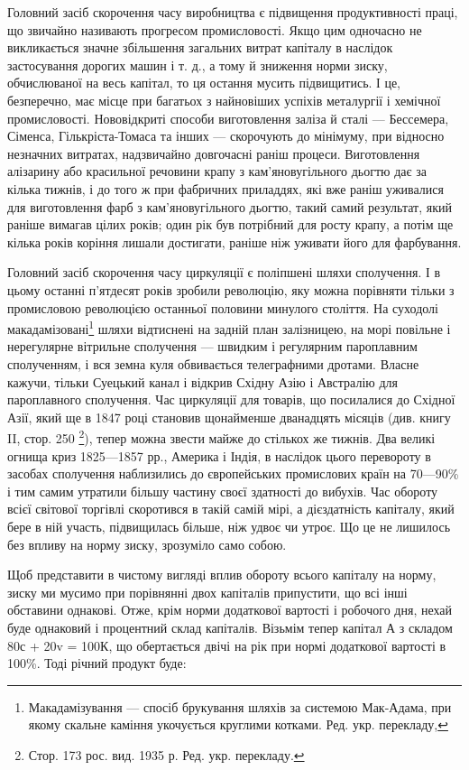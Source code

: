 Головний засіб скорочення часу виробництва є підвищення
продуктивності праці, що звичайно називають прогресом промисловості.
Якщо цим одночасно не викликається значне збільшення
загальних витрат капіталу в наслідок застосування дорогих
машин і т. д., а тому й зниження норми зиску, обчислюваної
на весь капітал, то ця остання мусить підвищитись. І це, безперечно,
має місце при багатьох з найновіших успіхів металургії
і хемічної промисловості. Нововідкриті способи виготовлення
заліза й сталі — Бессемера, Сіменса, Гількріста-Томаса та інших —
скорочують до мінімуму, при відносно незначних витратах,
надзвичайно довгочасні раніш процеси. Виготовлення алізарину
або красильної речовини крапу з кам’яновугільного дьогтю дає
за кілька тижнів, і до того ж при фабричних приладдях, які
вже раніш уживалися для виготовлення фарб з кам’яновугільного
дьогтю, такий самий результат, який раніше вимагав цілих
років; один рік був потрібний для росту крапу, а потім ще
кілька років коріння лишали достигати, раніше ніж уживати
його для фарбування.

Головний засіб скорочення часу циркуляції є поліпшені
шляхи сполучення. І в цьому останні п’ятдесят років зробили
революцію, яку можна порівняти тільки з промисловою революцією
останньої половини минулого століття. На суходолі макадамізовані\footnote*{
Макадамізування — спосіб брукування шляхів за системою Мак-Адама,
при якому скальне каміння укочується круглими котками. Ред. укр. перекладу,
} шляхи відтиснені на задній план залізницею, на
морі повільне і нерегулярне вітрильне сполучення — швидким
і регулярним пароплавним сполученням, і вся земна куля обвивається
телеграфними дротами. Власне кажучи, тільки Суецький
канал і відкрив Східну Азію і Австралію для пароплавного сполучення.
Час циркуляції для товарів, що посилалися до Східної
Азії, який ще в 1847 році становив щонайменше дванадцять
місяців (див. книгу II, стор. 250 \footnote*{
Стор. 173 рос. вид. 1935 р. Ред. укр. перекладу.
}), тепер можна звести майже
до стількох же тижнів. Два великі огнища криз 1825—1857 рр.,
Америка і Індія, в наслідок цього перевороту в засобах сполучення
наблизились до європейських промислових країн на
70—90\% і тим самим утратили більшу частину своєї здатності
до вибухів. Час обороту всієї світової торгівлі скоротився
в такій самій мірі, а дієздатність капіталу, який бере в ній
участь, підвищилась більше, ніж удвоє чи утроє. Що це не
лишилось без впливу на норму зиску, зрозуміло само собою.

Щоб представити в чистому вигляді вплив обороту всього
капіталу на норму, зиску ми мусимо при порівнянні двох
капіталів припустити, що всі інші обставини однакові. Отже,
крім норми додаткової вартості і робочого дня, нехай буде
однаковий і процентний склад капіталів. Візьмім тепер капітал
А з складом 80с + 20v = 100К, що обертається двічі на рік
при нормі додаткової вартості в 100\%. Тоді річний продукт
буде:


